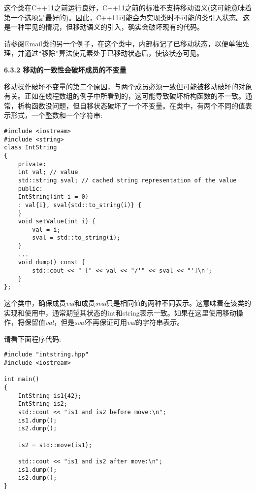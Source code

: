 这个类在C++11之前运行良好，C++11之前的标准不支持移动语义(这可能意味着第一个选项是最好的)。因此，C++11可能会为实现类时不可能的类引入状态。这是一种罕见的情况，但移动语义的引入，确实会破坏现有的代码。\par

请参阅Email类的另一个例子，在这个类中，内部标记了已移动状态，以便单独处理，并通过“移除”算法使元素处于已移动状态后，使该状态可见。\par

\hspace*{\fill} \par %
\textbf{6.3.2 移动的一致性会破坏成员的不变量}

移动操作破坏不变量的第二个原因，与两个成员必须一致但可能被移动破坏的对象有关。正如在线程数组的例子中所看到的，这可能导致破坏析构函数的不一致。通常，析构函数没问题，但自移状态破坏了一个不变量。在类中，有两个不同的值表示形式，一个整数和一个字符串:\par

{\color{red}{basics/intstring.hpp}}

\begin{lstlisting}[caption={}]
#include <iostream>
#include <string>
class IntString
{
	private:
	int val; // value
	std::string sval; // cached string representation of the value
	public:
	IntString(int i = 0)
	: val{i}, sval{std::to_string(i)} {
	}
	void setValue(int i) {
		val = i;
		sval = std::to_string(i);
	}
	...
	void dump() const {
		std::cout << " [" << val << "/'" << sval << "']\n";
	}
};
\end{lstlisting}

这个类中，确保成员\textit{val}和成员\textit{sval}只是相同值的两种不同表示。这意味着在该类的实现和使用中，通常期望其状态的int和string表示一致。如果在这里使用移动操作，将保留值\textit{val}，但是\textit{sval}不再保证可用\textit{val}的字符串表示。\par

请看下面程序代码:\par

{\color{red}{basics/intstring.cpp}}\par

\begin{lstlisting}[caption={}]
#include "intstring.hpp"
#include <iostream>

int main()
{
	IntString is1{42};
	IntString is2;
	std::cout << "is1 and is2 before move:\n";
	is1.dump();
	is2.dump();
	
	is2 = std::move(is1);
	
	std::cout << "is1 and is2 after move:\n";
	is1.dump();
	is2.dump();
}
\end{lstlisting}

